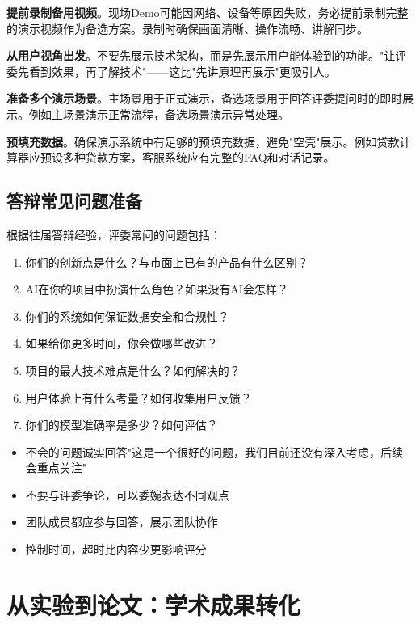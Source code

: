 \textbf{提前录制备用视频}。现场Demo可能因网络、设备等原因失败，务必提前录制完整的演示视频作为备选方案。录制时确保画面清晰、操作流畅、讲解同步。

\textbf{从用户视角出发}。不要先展示技术架构，而是先展示用户能体验到的功能。"让评委先看到效果，再了解技术"——这比"先讲原理再展示"更吸引人。

\textbf{准备多个演示场景}。主场景用于正式演示，备选场景用于回答评委提问时的即时展示。例如主场景演示正常流程，备选场景演示异常处理。

\textbf{预填充数据}。确保演示系统中有足够的预填充数据，避免"空壳"展示。例如贷款计算器应预设多种贷款方案，客服系统应有完整的FAQ和对话记录。

\subsection{答辩常见问题准备}

根据往届答辩经验，评委常问的问题包括：

\begin{enumerate}[leftmargin=2em]
  \item 你们的创新点是什么？与市面上已有的产品有什么区别？
  \item AI在你的项目中扮演什么角色？如果没有AI会怎样？
  \item 你们的系统如何保证数据安全和合规性？
  \item 如果给你更多时间，你会做哪些改进？
  \item 项目的最大技术难点是什么？如何解决的？
  \item 用户体验上有什么考量？如何收集用户反馈？
  \item 你们的模型准确率是多少？如何评估？
\end{enumerate}

\begin{notebox}[答辩技巧]
\begin{itemize}[leftmargin=1em]
  \item 不会的问题诚实回答"这是一个很好的问题，我们目前还没有深入考虑，后续会重点关注"
  \item 不要与评委争论，可以委婉表达不同观点
  \item 团队成员都应参与回答，展示团队协作
  \item 控制时间，超时比内容少更影响评分
\end{itemize}
\end{notebox}

\section{从实验到论文：学术成果转化}

